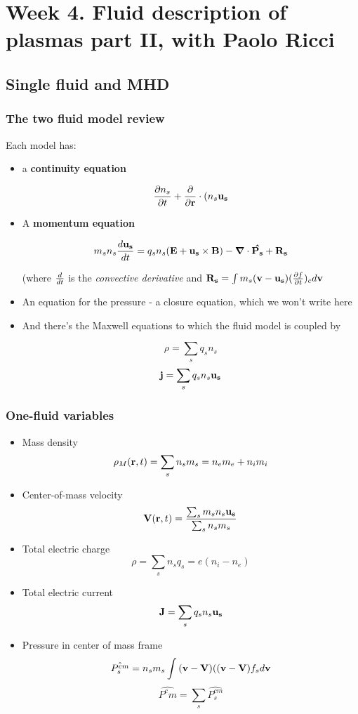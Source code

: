 \documentclass[PlasmaNotes.tex]{subfiles}
\begin{document}
\setcounter{section}{3}
\section{Week 4. Fluid description of plasmas part II, with Paolo Ricci}
\subsection{Single fluid and MHD}
\subsubsection{The two fluid model review}

Each model has:
\begin{itemize}
\item a \textbf{continuity equation}

\[\frac{\partial n_s}{\partial t} + \frac{\partial }{\partial \mathbf{r}} \cdot (n_s \mathbf{u_s} \]

\item A \textbf{momentum equation}

\[ m_s n_s \frac{d \mathbf{u_s}}{d t} = q_s n_s (\mathbf{E} + \mathbf{u_s} \times \mathbf{B}) - \mbox{\boldmath$ \nabla $} \cdot \mathbf{\hat{P_s}} + \mathbf{R_s} \]

(where $\frac{d }{d t}$ is the \emph{convective derivative} and $\mathbf{R_s} = \int{m_s (\ensuremath{\mathbf{v}}-\ensuremath{\mathbf{u_s}})(\frac{\partial f}{\partial t})_c d\ensuremath{\mathbf{v}}}$

\item An equation for the pressure - a closure equation, which we won't write here

\item And there's the Maxwell equations to which the fluid model is coupled by

\[ \rho = \sum_s{q_s n_s} \]
\[ \mathbf{j} = \sum_s{q_s n_s \mathbf{u_s}} \]
\end{itemize}

\subsubsection{One-fluid variables}

\begin{itemize}
\item Mass density
\[ \rho_M(\mathbf{r}, t) = \sum_s{n_s m_s} = n_e m_e + n_i m_i \]
\item Center-of-mass velocity
\[ \mathbf{V}(\mathbf{r}, t) = \frac{\sum_s{m_s n_s \mathbf{u_s}}}{\sum_s{n_s m_s}} \]
\item Total electric charge
\[ \rho = \sum_s{n_s q_s} = e(n_i - n_e) \]
\item Total electric current
\[ \mathbf{J} = \sum_s{q_s n_s \mathbf{u_s}} \]
\item Pressure in center of mass frame
\[ \hat{P_s^{cm}} = n_s m_s \int{(\ensuremath{\mathbf{v}} - \ensuremath{\mathbf{V}})((\ensuremath{\mathbf{v}} - \ensuremath{\mathbf{V}}) f_s d\ensuremath{\mathbf{v}}} \]
\[ \hat{P^cm} = \sum_s{\hat{P_s^{cm}}} \]
\end{itemize}
\end{document}
